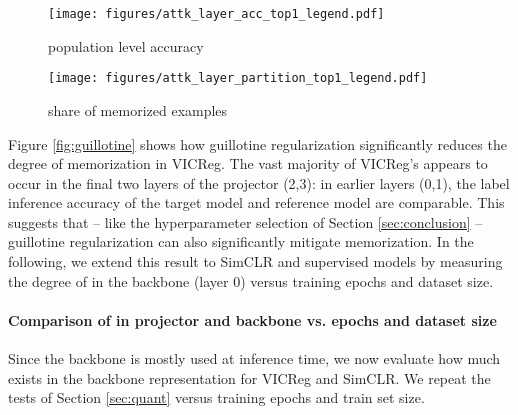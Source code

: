 \begin{figure*}[h]
\captionsetup[subfigure]{font=scriptsize,labelfont=scriptsize}
     \centering
     \begin{subfigure}[b]{0.49\textwidth}
         \centering
         \texttt{[image: figures/attk\_layer\_acc\_top1\_legend.pdf]}
         \caption{population level accuracy}
     \end{subfigure}
     \begin{subfigure}[b]{0.49\textwidth}
         \centering
         \texttt{[image: figures/attk\_layer\_partition\_top1\_legend.pdf]}
         \caption{share of memorized examples}
     \end{subfigure}
     \hfill
\caption[\dejavu memorization versus layer from backbone (0) to projector output (3).]{
\dejavu memorization versus layer from backbone (0) to projector output (3). The memorization tests of Section \ref{sec:quant} are evaluated at each level of the VICReg projector. We see that \dejavu is significantly stronger closer to the projector output and nearly zero near the backbone. Interestingly, most memorization appears to occur in the final two layers of VICReg.
}
\label{fig:guillotine}
\end{figure*}

Figure \ref{fig:guillotine} shows how guillotine regularization significantly reduces the degree of memorization in VICReg. The vast majority of VICReg's \dejavu appears to occur in the final two layers of the projector (2,3): in earlier layers (0,1), the label inference accuracy of the target model and reference model are comparable. This suggests that -- like the hyperparameter selection of Section \ref{sec:conclusion} -- guillotine regularization can also significantly mitigate \dejavu memorization. In the following, we extend this result to SimCLR and supervised models by measuring the degree of \dejavu in the backbone (layer 0) versus training epochs and dataset size. 

\newpage

\paragraph{Comparison of \dejavu in projector and backbone vs. epochs and dataset size}
Since the backbone is mostly used at inference time, we now evaluate how much \dejavu exists in the backbone representation for VICReg and SimCLR. We repeat the tests of Section \ref{sec:quant} versus training epochs and train set size. 


